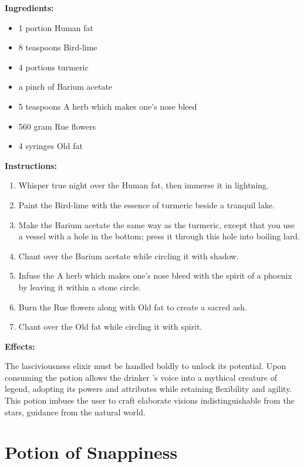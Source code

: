 \documentclass{article}
\begin{document}
\textbf{Ingredients:}

\begin{itemize}
  \item 1 portion Human fat
  \item 8 teaspoons Bird-lime
  \item 4 portions turmeric
  \item a pinch of Barium acetate
  \item 5 teaspoons A herb which makes one's nose bleed
  \item 560 gram Rue flowers
  \item 4 syringes Old fat
\end{itemize}

\textbf{Instructions:}

\begin{enumerate}
  \item Whisper true night over the Human fat, then immerse it in lightning.
  \item Paint the Bird-lime with the essence of turmeric beside a tranquil lake.
  \item Make the Barium acetate the same way as the turmeric, except that you use a vessel with a hole in the bottom; press it through this hole into boiling lard.
  \item Chant over the Barium acetate while circling it with shadow.
  \item Infuse the A herb which makes one's nose bleed with the spirit of a phoenix by leaving it within a stone circle.
  \item Burn the Rue flowers along with Old fat to create a sacred ash.
  \item Chant over the Old fat while circling it with spirit.
\end{enumerate}

\textbf{Effects:}

The lasciviousness elixir must be handled boldly to unlock its potential. Upon consuming the potion allows the drinker 's voice into a mythical creature of legend, adopting its powers and attributes while retaining flexibility and agility. This potion imbues the user to craft elaborate visions indistinguishable from the stars, guidance from the natural world.

\newpage
\section*{Potion of Snappiness}
\end{document}
